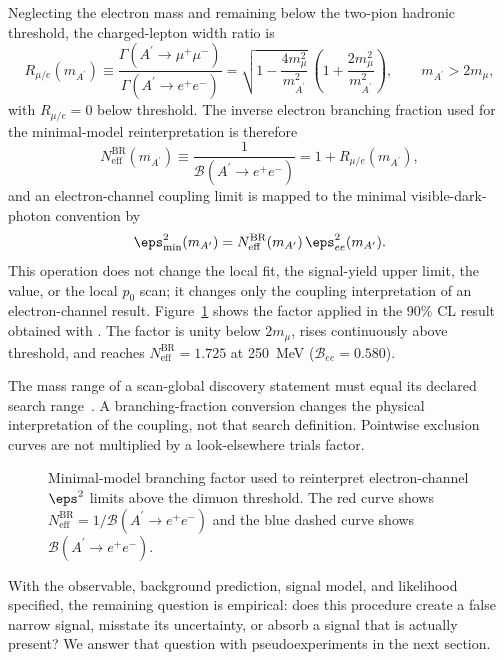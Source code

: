 Neglecting the electron mass and remaining below the two-pion hadronic threshold, the
charged-lepton width ratio is
\begin{equation}
R_{\mu/e}(m_{A^\prime})
\equiv
\frac{\Gamma(A^\prime\to\mu^+\mu^-)}
{\Gamma(A^\prime\to e^+e^-)}
=
\sqrt{1-\frac{4m_\mu^2}{m_{A^\prime}^2}}\,
\left(1+\frac{2m_\mu^2}{m_{A^\prime}^2}\right),
\qquad m_{A^\prime}>2m_\mu,
\label{eq:dimuon-width-ratio}
\end{equation}
with $R_{\mu/e}=0$ below threshold. The inverse electron branching fraction used for
the minimal-model reinterpretation is therefore
\begin{equation}
N_{\mathrm{eff}}^{\mathrm{BR}}(m_{A^\prime})
\equiv
\frac{1}{\mathcal{B}(A^\prime\to e^+e^-)}
=
1+R_{\mu/e}(m_{A^\prime}),
\label{eq:dimuon-neff}
\end{equation}
and an electron-channel coupling limit is mapped to the minimal visible-dark-photon
convention by
\begin{equation}
\eps^2_{\mathrm{min}}(m_{A^\prime})
=
N_{\mathrm{eff}}^{\mathrm{BR}}(m_{A^\prime})\,\eps^2_{ee}(m_{A^\prime}).
\label{eq:dimuon-eps2-map}
\end{equation}
This operation does not change the local fit, the signal-yield upper limit, the
\CLs{} value, or the local $p_0$ scan; it changes only the coupling interpretation of
an electron-channel result. Figure~\ref{fig:methodology-dimuon-factor} shows the
factor applied in the 90\% CL result obtained with \CLs{}. The factor is unity below
$2m_\mu$, rises continuously above threshold, and reaches
$N_{\mathrm{eff}}^{\mathrm{BR}}=1.725$ at \SI{250}{MeV}
($\mathcal{B}_{ee}=0.580$).

The mass range of a scan-global discovery statement must equal its declared
search range~\cite{GrossVitells2010}. A branching-fraction conversion changes the
physical interpretation of the coupling, not that search definition. Pointwise
\CLs{} exclusion curves are not multiplied by a look-elsewhere trials factor.

\begin{figure}[H]
\centering
{}
\caption{Minimal-model branching factor used to reinterpret electron-channel
$\eps^2$ limits above the dimuon threshold. The red curve shows
$N_{\mathrm{eff}}^{\mathrm{BR}}=1/\mathcal{B}(A^\prime\to e^+e^-)$ and the blue dashed
curve shows $\mathcal{B}(A^\prime\to e^+e^-)$.}
\label{fig:methodology-dimuon-factor}
\end{figure}

With the observable, background prediction, signal model, and likelihood specified,
the remaining question is empirical: does this procedure create a false narrow signal,
misstate its uncertainty, or absorb a signal that is actually present? We answer that
question with pseudoexperiments in the next section.
